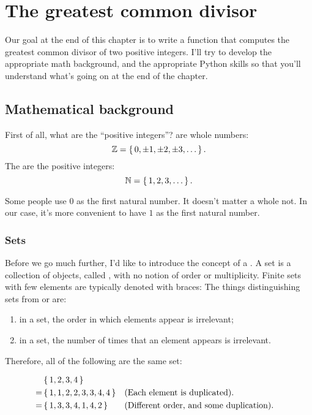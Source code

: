 \chapter{The greatest common divisor}

Our goal at the end of this chapter is to write a function that
computes the greatest common divisor of two positive integers. I'll
try to develop the appropriate math background, and the appropriate
Python skills so that you'll understand what's going on at the end of
the chapter.

\section{Mathematical background}

First of all, what are the ``positive integers''?  are
whole numbers: $$\mathbb{Z} = \left\{\, 0, \pm 1, \pm 2, \pm 3, \dots \,\right\}.$$ The
 are the positive integers:
$$\mathbb{N} = \left\{\, 1,2,3,\dots \,\right\}.$$

\begin{remark}
  Some people use $0$ as the first natural number. It doesn't matter a
  whole not. In our case, it's more convenient to have $1$ as the
  first natural number.
\end{remark}

\subsection{Sets}

Before we go much further, I'd like to introduce the concept of a
. A set is a collection of objects, called ,
with no notion of order or multiplicity. Finite sets with few elements
are typically denoted with braces: 
The things distinguishing sets from  or 
are:

\begin{enumerate}
\item in a set, the order in which elements appear is irrelevant;
\item in a set, the number of times that an element appears is
  irrelevant.
\end{enumerate}

Therefore, all of the following are the same set:

\begin{align*}
  & \left\{\, 1,2,3,4 \,\right\} \\
  = & \left\{\, 1,1,2,2,3,3,4,4 \,\right\} && \text{(Each element is duplicated).} \\
  = & \left\{\, 1, 3, 3, 4, 1, 4, 2 \,\right\} && \text{(Different order, and some duplication).}
\end{align*}


